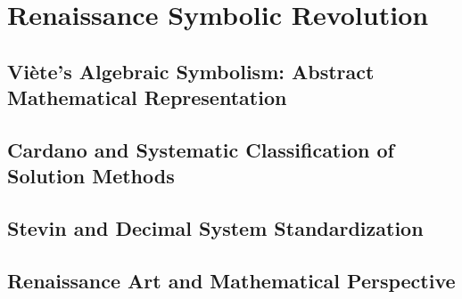 
\chapter{Renaissance Symbolic Revolution}

\section{Viète's Algebraic Symbolism: Abstract Mathematical Representation}

\section{Cardano and Systematic Classification of Solution Methods}

\section{Stevin and Decimal System Standardization}

\section{Renaissance Art and Mathematical Perspective}
